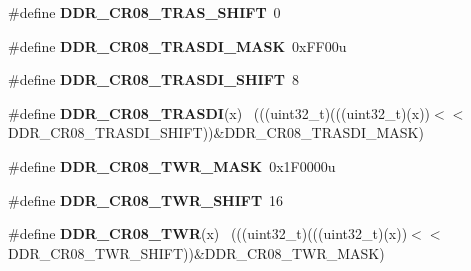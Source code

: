 \begin{DoxyCompactItemize}
\item 
\hypertarget{group___d_d_r___register___masks_ga0dd7fe161c3a33b4ba4037a670363d49}{}\#define {\bfseries D\+D\+R\+\_\+\+C\+R08\+\_\+\+T\+R\+A\+S\+\_\+\+S\+H\+I\+F\+T}~0\label{group___d_d_r___register___masks_ga0dd7fe161c3a33b4ba4037a670363d49}

\item 
\hypertarget{group___d_d_r___register___masks_ga9e3106136fac8cf4cb65af4da52bb467}{}\#define {\bfseries D\+D\+R\+\_\+\+C\+R08\+\_\+\+T\+R\+A\+S\+D\+I\+\_\+\+M\+A\+S\+K}~0x\+F\+F00u\label{group___d_d_r___register___masks_ga9e3106136fac8cf4cb65af4da52bb467}

\item 
\hypertarget{group___d_d_r___register___masks_ga443730af5810c5cb6a3c73ff1c203ecd}{}\#define {\bfseries D\+D\+R\+\_\+\+C\+R08\+\_\+\+T\+R\+A\+S\+D\+I\+\_\+\+S\+H\+I\+F\+T}~8\label{group___d_d_r___register___masks_ga443730af5810c5cb6a3c73ff1c203ecd}

\item 
\hypertarget{group___d_d_r___register___masks_ga9c16f891b89888cadae8bbc80ff86dbe}{}\#define {\bfseries D\+D\+R\+\_\+\+C\+R08\+\_\+\+T\+R\+A\+S\+D\+I}(x)                                          ~(((uint32\+\_\+t)(((uint32\+\_\+t)(x))$<$$<$D\+D\+R\+\_\+\+C\+R08\+\_\+\+T\+R\+A\+S\+D\+I\+\_\+\+S\+H\+I\+F\+T))\&D\+D\+R\+\_\+\+C\+R08\+\_\+\+T\+R\+A\+S\+D\+I\+\_\+\+M\+A\+S\+K)\label{group___d_d_r___register___masks_ga9c16f891b89888cadae8bbc80ff86dbe}

\item 
\hypertarget{group___d_d_r___register___masks_gadfd6c951de597ef4a295228d62ae257d}{}\#define {\bfseries D\+D\+R\+\_\+\+C\+R08\+\_\+\+T\+W\+R\+\_\+\+M\+A\+S\+K}~0x1\+F0000u\label{group___d_d_r___register___masks_gadfd6c951de597ef4a295228d62ae257d}

\item 
\hypertarget{group___d_d_r___register___masks_ga86eb08db13958498ea6557e0dc7bee42}{}\#define {\bfseries D\+D\+R\+\_\+\+C\+R08\+\_\+\+T\+W\+R\+\_\+\+S\+H\+I\+F\+T}~16\label{group___d_d_r___register___masks_ga86eb08db13958498ea6557e0dc7bee42}

\item 
\hypertarget{group___d_d_r___register___masks_ga1dad08f356c38c61524c673bbcf7764f}{}\#define {\bfseries D\+D\+R\+\_\+\+C\+R08\+\_\+\+T\+W\+R}(x)                                                ~(((uint32\+\_\+t)(((uint32\+\_\+t)(x))$<$$<$D\+D\+R\+\_\+\+C\+R08\+\_\+\+T\+W\+R\+\_\+\+S\+H\+I\+F\+T))\&D\+D\+R\+\_\+\+C\+R08\+\_\+\+T\+W\+R\+\_\+\+M\+A\+S\+K)\label{group___d_d_r___register___masks_ga1dad08f356c38c61524c673bbcf7764f}


\end{DoxyCompactItemize}
